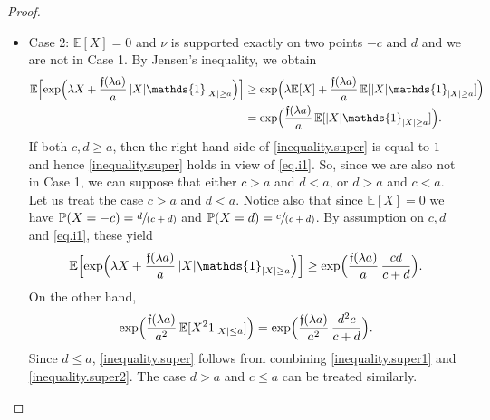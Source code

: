 \documentclass[10pt]{amsart}
\newcommand{\spfrac}[2]{\sfrac{#1}{(#2)}}
\theoremstyle{plain}
\theoremstyle{definition}
\newcommand\E{\mathbb{E}}
\newcommand\p{\mathbb{P}}
\begin{document}
\begin{proof}
\begin{itemize}
\item Case 2: $\E[X]=0$ and $\nu$ is supported exactly on two points $-c$ and $d$ and we are not in Case 1. By Jensen's inequality, we obtain
\begin{equation}\label{eq.i1}
\begin{aligned}
\E\Bigl[\exp\Bigl(\lambda X +\frac{\mathfrak{f}(\lambda a)}{ a}\, |X| \mathds{1}_{|X|\geq a}\Bigr)\Bigr] &\geq \exp\Bigl(\lambda \E[X]+ \frac{\mathfrak{f}(\lambda a)}{a}\, \E[|X|\mathds{1}_{|X|\geq a}]\Bigr)\\ &=
\exp\Bigl(\frac{\mathfrak{f}(\lambda a)}{a}\, \E[|X| \mathds{1}_{|X|\geq a}]\Bigr).
\end{aligned}
\end{equation}
If both $c,d\geq a$, then the right hand side of \eqref{inequality.super} is equal to $1$ and hence \eqref{inequality.super} holds in view of \eqref{eq.i1}. So, since we are also not in Case 1, we can suppose that either $c > a$ and $d< a$, or $d > a$ and $c< a$. Let us treat the case $c > a$ and $d < a$. Notice also that since $\E[X]=0$ we have $\p(X=-c)=\spfrac{d}{c+d}$ and $\p(X=d)=\spfrac{c}{c+d}$.
By assumption on $c,d$ and \eqref{eq.i1}, these yield
\begin{equation}\label{inequality.super1}
\E\Bigl[\exp\Bigl(\lambda X +\frac{\mathfrak{f}(\lambda a)}{ a}\, |X| \mathds{1}_{|X|\geq a}\Bigr)\Bigr]
\geq \exp\Bigl(\frac{\mathfrak{f}(\lambda a)}{a}\, \frac{cd}{c+d}\Bigr).\end{equation}
On the other hand,
\begin{equation}\label{inequality.super2}
\exp \Bigl(\frac{\mathfrak{f}(\lambda a)}{a^2}\, \E[X^2 1_{|X|\leq a}]\Bigr)=
\exp\Bigl(\frac{\mathfrak{f}(\lambda a)}{a^2}\, \frac{d^2c}{c+d}\Bigr).\end{equation}
Since $d\leq a$, \eqref{inequality.super} follows from combining \eqref{inequality.super1} and \eqref{inequality.super2}. The case $d>a$ and $c\leq a$ can be treated similarly.


\end{itemize}
\end{proof}
\end{document}
